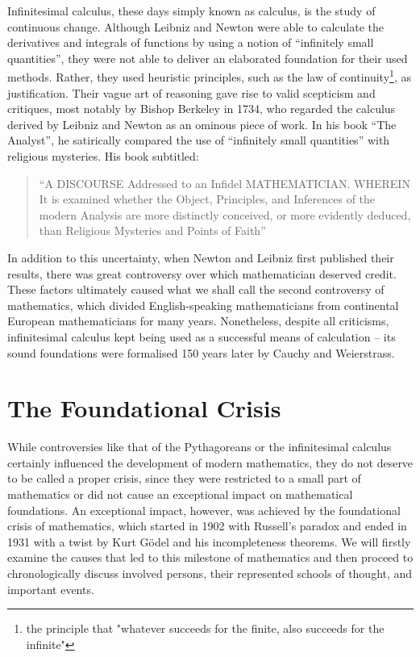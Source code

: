 \documentclass{article}
\begin{document}
Infinitesimal calculus, these days simply known as calculus, is the study of continuous change. Although Leibniz and Newton were able to calculate the derivatives and integrals of functions by using a notion of ``infinitely small quantities'', they were not able to deliver an elaborated foundation for their used methods. Rather, they used heuristic principles, such as the law of continuity\footnote{the principle that "whatever succeeds for the finite, also succeeds for the infinite"}, as justification. Their vague art of reasoning gave rise to valid scepticism and critiques, most notably by Bishop Berkeley in 1734, who regarded the calculus derived by Leibniz and Newton as an ominous piece of work. In his book ``The Analyst'', he satirically compared the use of ``infinitely small quantities'' with religious mysteries. His book subtitled:
\begin{quote}
``A DISCOURSE Addressed to an Infidel MATHEMATICIAN\@. WHEREIN It is examined whether the Object, Principles, and Inferences of the modern Analysis are more distinctly conceived, or more evidently deduced, than Religious Mysteries and Points of Faith''
\end{quote}
In addition to this uncertainty, when Newton and Leibniz first published their results, there was great controversy over which mathematician deserved credit. These factors ultimately caused what we shall call the second controversy of mathematics, which divided English-speaking mathematicians from continental European mathematicians for many years. None\-theless, despite all criticisms, infinitesimal calculus kept being used as a successful means of calculation -- its sound foundations were formalised 150 years later by Cauchy and Weierstrass.

\section{The Foundational Crisis}
While controversies like that of the Pythagoreans or the infinitesimal calculus certainly influenced the development of modern mathematics, they do not deserve to be called a proper crisis, since they were restricted to a small part of mathematics or did not cause an exceptional impact on mathematical foundations. An exceptional impact, however, was achieved by the foundational crisis of mathematics, which started in 1902 with Russell's paradox and ended in 1931 with a twist by Kurt Gödel and his incompleteness theorems.
We will firstly examine the causes that led to this milestone of mathematics and then proceed to chronologically discuss involved persons, their represented schools of thought, and important events.
\end{document}
